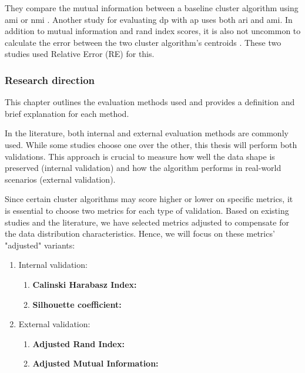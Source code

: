 They compare the mutual information between a baseline cluster algorithm using \gls{ami} \citep{9679364} or \gls{nmi} \citep{xia_distributed_2020,sun_privbv_2022}.
Another study for evaluating \gls{dp} with \gls{ap} uses both \gls{ari} and \gls{ami}.
In addition to mutual information and rand index scores, it is also not uncommon to calculate the error between the two cluster algorithm's centroids \citep{xia_distributed_2020, 9679364}.
These two studies used Relative Error (RE) for this.

\subsubsection{Research direction}
This chapter outlines the evaluation methods used and provides a definition and brief explanation for each method.

In the literature, both internal and external evaluation methods are commonly used.
While some studies choose one over the other, this thesis will perform both validations.
This approach is crucial to measure how well the data shape is preserved (internal validation) and how the algorithm performs in real-world scenarios (external validation).

Since certain cluster algorithms may score higher or lower on specific metrics, it is essential to choose two metrics for each type of validation.
Based on existing studies and the literature, we have selected metrics adjusted to compensate for the data distribution characteristics.
Hence, we will focus on these metrics' "adjusted" variants:
\begin{enumerate}
  \item Internal validation:
        \begin{enumerate}
          \item \textbf{Calinski Harabasz Index:}
          \item \textbf{Silhouette coefficient:}
        \end{enumerate}
  \item External validation:
        \begin{enumerate}
          \item \textbf{Adjusted Rand Index:}
          \item \textbf{Adjusted Mutual Information:}
        \end{enumerate}
\end{enumerate}
